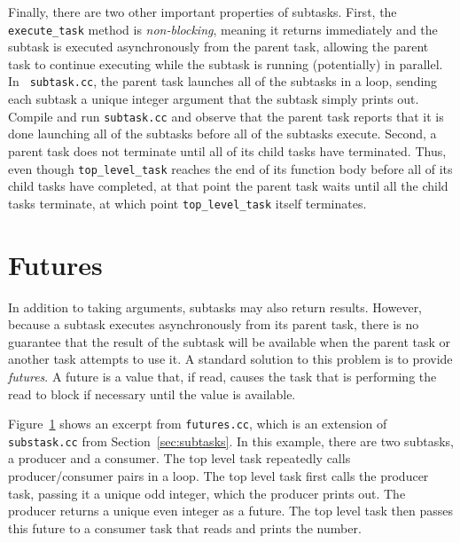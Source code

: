 Finally, there are two other important properties of subtasks.  First,
the {\tt execute\_task} method is {\em non-blocking}, meaning it
returns immediately and the subtask is executed asynchronously from
the parent task, allowing the parent task to continue executing while
the subtask is running (potentially) in parallel.  In {\tt
  subtask.cc}, the parent task launches all of the subtasks in a loop,
sending each subtask a unique integer argument that the subtask simply prints
out.  Compile and run {\tt subtask.cc} and observe that the
parent task reports that it is done launching all of the subtasks
before all of the subtasks execute.  Second, a parent task does not
terminate until all of its child tasks have terminated.  Thus, even
though {\tt top\_level\_task} reaches the end of its function body
before all of its child tasks have completed, at that point the parent
task waits until all the child tasks terminate, at which point
{\tt top\_level\_task} itself terminates.

\section{Futures}
\label{sec:futures}

\begin{figure}
  {\small
    }
\caption{}
\label{fig:futures}
\end{figure}

In addition to taking arguments, subtasks may also return results.
However, because a subtask executes asynchronously from its parent
task, there is no guarantee that the result of the subtask will be
available when the parent task or another task attempts to use it.  A
standard solution to this problem is to provide {\em futures}.  A future
is a value that, if read, causes the task that is performing the
read to block if necessary until the value is available.

Figure~\ref{fig:futures} shows an excerpt from {\tt futures.cc}, which
is an extension of {\tt substask.cc} from
Section~\ref{sec:subtasks}.  In this example, there are two subtasks,
a producer and a consumer.  The top level task repeatedly calls
\mbox{producer/consumer} pairs in a loop.  The top level task first calls the
producer task, passing it a unique odd integer, which the producer
prints out.  The producer returns a unique even integer as a future.
The top level task then passes this future to a consumer task that
reads and prints the number.

